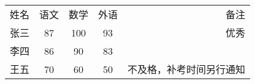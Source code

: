 \documentclass{ctexart}
\begin{document}
\begin{tabular}{lcccr}
    姓名&语文&数学&外语&备注\\
    张三&87&100&93&优秀\\
    李四&86&90&83&\\
    王五&70&60&50&不及格，补考时间另行通知\\
\end{tabular}
\end{document}
